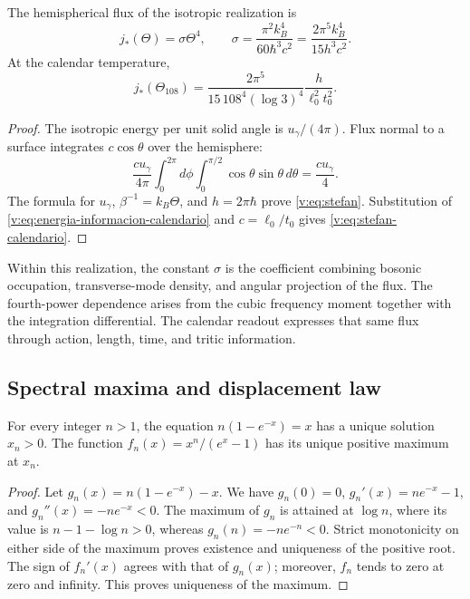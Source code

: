 \begin{proposition}
\label{v:prop:stefan}
The hemispherical flux of the isotropic realization is
\begin{equation}
 j_*(\Theta)=\sigma\Theta^4,\qquad
 \sigma=\frac{\pi^2 k_B^4}{60\hbar^3c^2}
 =\frac{2\pi^5k_B^4}{15h^3c^2}.
 \label{v:eq:stefan}
\end{equation}
At the calendar temperature,
\begin{equation}
 j_*(\Theta_{108})
 =\frac{2\pi^5}{15\,108^4(\log3)^4}
 \frac{h}{\ell_0^2t_0^2}.
 \label{v:eq:stefan-calendario}
\end{equation}
\end{proposition}
\begin{proof}
The isotropic energy per unit solid angle is
\(u_\gamma/(4\pi)\). Flux normal to a surface integrates
\(c\cos\theta\) over the hemisphere:
\[
 \frac{cu_\gamma}{4\pi}
 \int_0^{2\pi}\!d\phi\int_0^{\pi/2}\cos\theta\sin\theta\,d\theta
 =\frac{cu_\gamma}{4}.
\]
The formula for \(u_\gamma\), \(\beta^{-1}=k_B\Theta\), and
\(h=2\pi\hbar\) prove \eqref{v:eq:stefan}.
Substitution of \eqref{v:eq:energia-informacion-calendario} and
\(c=\ell_0/t_0\) gives \eqref{v:eq:stefan-calendario}.
\end{proof}

Within this realization, the constant \(\sigma\) is the coefficient
combining bosonic occupation, transverse-mode density, and
angular projection of the flux. The fourth-power dependence arises from the cubic
frequency moment together with the integration differential. The calendar
readout expresses that same flux through action, length,
time, and tritic information.

\newpage
\subsection{Spectral maxima and displacement law}

\begin{lemma}
\label{v:lem:raiz-wien}
For every integer \(n>1\), the equation
\(n(1-e^{-x})=x\) has a unique solution \(x_n>0\).
The function \(f_n(x)=x^n/(e^x-1)\) has its unique positive maximum at
\(x_n\).
\end{lemma}
\begin{proof}
Let \(g_n(x)=n(1-e^{-x})-x\). We have
\(g_n(0)=0\), \(g_n'(x)=ne^{-x}-1\), and
\(g_n''(x)=-ne^{-x}<0\). The maximum of \(g_n\) is attained at
\(\log n\), where its value is \(n-1-\log n>0\), whereas
\(g_n(n)=-ne^{-n}<0\). Strict monotonicity on either side of the maximum
proves existence and uniqueness of the positive root. The sign of
\(f_n'(x)\) agrees with that of \(g_n(x)\); moreover, \(f_n\) tends
to zero at zero and infinity. This proves uniqueness of the maximum.
\end{proof}

